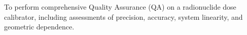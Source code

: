 To perform comprehensive Quality Assurance (QA) on a radionuclide dose calibrator, including assessments of precision, accuracy, system linearity, and geometric dependence.